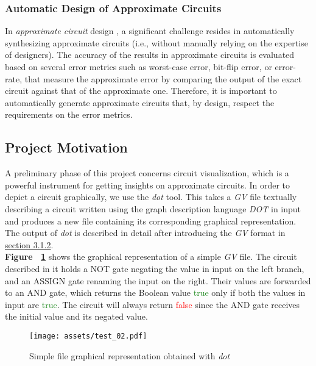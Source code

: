 \documentclass[]{usiinfbachelorproject}
\begin{document}
\subsubsection{Automatic Design of Approximate Circuits}\label{subsubsec:automatic-design}
In \textit{approximate circuit} design \cite{eta}, a significant challenge resides in automatically synthesizing approximate circuits (i.e., without manually relying on the expertise of designers). The accuracy of the results in approximate circuits is evaluated based on several error metrics such as worst-case error, bit-flip error, or error-rate, that measure the approximate error by comparing the output of the exact circuit against that of the approximate one. Therefore, it is important to automatically generate approximate circuits that, by design, respect the requirements on the error metrics.

\subsection{Project Motivation}\label{subsec:project-motivation}
A preliminary phase of this project concerns circuit visualization, which is a powerful instrument for getting insights on approximate circuits. In order to depict a circuit graphically, we use the \textit{dot} tool. This takes a \textit{GV} file textually describing a circuit written using the graph description language \textit{DOT} in input and produces a new file containing its corresponding graphical representation. The output of \textit{dot} is described in detail after introducing the \textit{GV} format in \hyperref[subsubsec:gv-format]{section 3.1.2}. \\
\textbf{Figure ~\ref{fig:simple-pdf-init}} shows the graphical representation of a simple \textit{GV} file. The circuit described in it holds a NOT gate negating the value in input on the left branch,
and an ASSIGN gate renaming the input on the right. Their values are forwarded to an AND gate, which returns the Boolean value \textcolor{ForestGreen}{true} only if both the values in input are \textcolor{ForestGreen}{true}. The circuit will always return \textcolor{red}{false} since the AND gate receives the initial value and its negated value.
\begin{figure}[H]
    \centering
    \texttt{[image: assets/test\_02.pdf]}
    \caption{Simple file graphical representation obtained with \textit{dot}}
    \label{fig:simple-pdf-init}
\end{figure}
\end{document}
